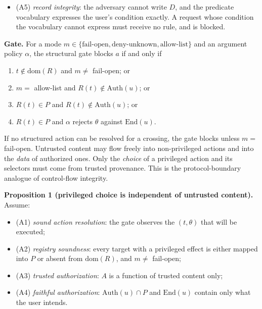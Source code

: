 \documentclass[
  11pt]{article}
\providecommand{\tightlist}{%
  \setlength{\itemsep}{0pt}\setlength{\parskip}{0pt}}
\begin{document}
\begin{itemize}
\tightlist
\item
  (A5) \emph{record integrity}: the adversary cannot write \(D\), and
  the predicate vocabulary expresses the user's condition exactly. A
  request whose condition the vocabulary cannot express must receive no
  rule, and is blocked.
\end{itemize}

\textbf{Gate.} For a mode
\(m \in \{\text{fail-open}, \text{deny-unknown}, \text{allow-list}\}\)
and an argument policy \(\alpha\), the structural gate blocks \(a\) if
and only if

\begin{enumerate}
\def\labelenumi{\arabic{enumi}.}
\tightlist
\item
  \(t \notin \mathrm{dom}(R)\) and \(m \neq\) fail-open; or
\item
  \(m =\) allow-list and \(R(t) \notin \mathrm{Auth}(u)\); or
\item
  \(R(t) \in P\) and \(R(t) \notin \mathrm{Auth}(u)\); or
\item
  \(R(t) \in P\) and \(\alpha\) rejects \(\theta\) against
  \(\mathrm{End}(u)\).
\end{enumerate}

If no structured action can be resolved for a crossing, the gate blocks
unless \(m =\) fail-open. Untrusted content may flow freely into
non-privileged actions and into the \emph{data} of authorized ones. Only
the \emph{choice} of a privileged action and its selectors must come
from trusted provenance. This is the protocol-boundary analogue of
control-flow integrity.

\textbf{Proposition 1 (privileged choice is independent of untrusted
content).} Assume:

\begin{itemize}
\tightlist
\item
  (A1) \emph{sound action resolution}: the gate observes the
  \((t, \theta)\) that will be executed;
\item
  (A2) \emph{registry soundness}: every target with a privileged effect
  is either mapped into \(P\) or absent from \(\mathrm{dom}(R)\), and
  \(m \neq\) fail-open;
\item
  (A3) \emph{trusted authorization}: \(A\) is a function of trusted
  content only;
\item
  (A4) \emph{faithful authorization}: \(\mathrm{Auth}(u) \cap P\) and
  \(\mathrm{End}(u)\) contain only what the user intends.
\end{itemize}
\end{document}
